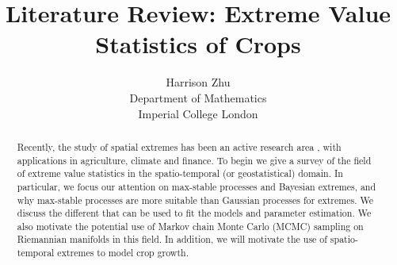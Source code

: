 \documentclass[12pt]{article}
\title{Literature Review: Extreme Value Statistics of Crops}
\author{Harrison Zhu\\ \smallskip
Department of Mathematics\\ 
Imperial College London \\
}
\theoremstyle{definition}
\theoremstyle{remark}
\theoremstyle{definition}
\theoremstyle{plain}
\begin{document}
\maketitle
\nocite{*}
\begin{abstract}
Recently, the study of spatial extremes has been an active research area \cite{Thibaud2015EfficientProcesses}, with applications in agriculture, climate and finance. To begin we give a survey of the field of extreme value statistics in the spatio-temporal (or geostatistical) domain. In particular, we focus our attention on max-stable processes and Bayesian extremes, and why max-stable processes are more suitable than Gaussian processes for extremes. We discuss the different that can be used to fit the models and parameter estimation. We also motivate the potential use of Markov chain Monte Carlo (MCMC) sampling on Riemannian manifolds in this field. In addition, we will motivate the use of spatio-temporal extremes to model crop growth.
\end{abstract}
\tableofcontents
\end{document}
